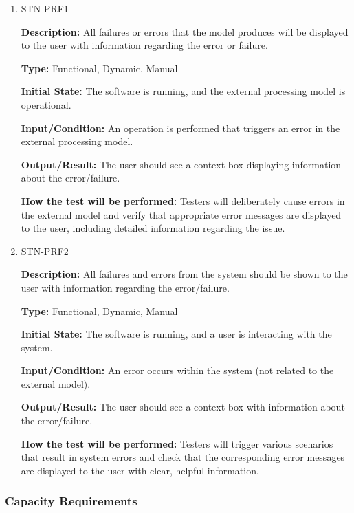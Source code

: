 \documentclass[12pt, titlepage]{article}
\begin{document}
\begin{enumerate}

\item{STN-PRF1\\}

\textbf{Description:} All failures or errors that the model produces will be displayed to the user with information regarding the error or failure.

\textbf{Type:} Functional, Dynamic, Manual

\textbf{Initial State:} The software is running, and the external processing model is operational.

\textbf{Input/Condition:} An operation is performed that triggers an error in the external processing model.

\textbf{Output/Result:} The user should see a context box displaying information about the error/failure.

\textbf{How the test will be performed:} Testers will deliberately cause errors in the external model and verify that appropriate error messages are displayed to the user, including detailed information regarding the issue.

\item{STN-PRF2\\}

\textbf{Description:} All failures and errors from the system should be shown to the user with information regarding the error/failure.

\textbf{Type:} Functional, Dynamic, Manual

\textbf{Initial State:} The software is running, and a user is interacting with the system.

\textbf{Input/Condition:} An error occurs within the system (not related to the external model).

\textbf{Output/Result:} The user should see a context box with information about the error/failure.

\textbf{How the test will be performed:} Testers will trigger various scenarios that result in system errors and check that the corresponding error messages are displayed to the user with clear, helpful information.

\end{enumerate}

\subsubsection{Capacity Requirements}
\end{document}
